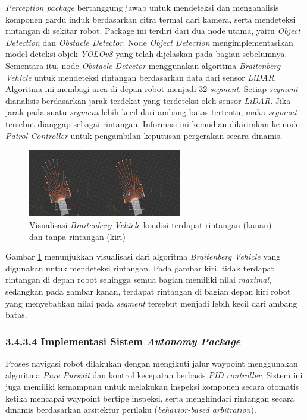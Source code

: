 \emph{Perception package} bertanggung jawab untuk mendeteksi dan menganalisis komponen gardu induk berdasarkan citra termal dari kamera, serta mendeteksi rintangan di sekitar robot. Package ini terdiri dari dua node utama, yaitu \emph{Object Detection} dan \emph{Obstacle Detector}. Node \emph{Object Detection} mengimplementasikan model deteksi objek \emph{YOLOv8} yang telah dijelaskan pada bagian sebelumnya. Sementara itu, node \emph{Obstacle Detector} menggunakan algoritma \emph{Braitenberg Vehicle} untuk mendeteksi rintangan berdasarkan data dari sensor \emph{LiDAR}. Algoritma ini membagi area di depan robot menjadi 32 \emph{segment}. Setiap \emph{segment} dianalisis berdasarkan jarak terdekat yang terdeteksi oleh sensor \emph{LiDAR}. Jika jarak pada suatu \emph{segment} lebih kecil dari ambang batas tertentu, maka \emph{segment} tersebut dianggap sebagai rintangan. Informasi ini kemudian dikirimkan ke node \emph{Patrol Controller} untuk pengambilan keputusan pergerakan secara dinamis.

\begin{figure}[H]
  \centering
  \includegraphics[width=0.6\textwidth]{gambar/bab3/obstacle-bb.png}
  \caption{Visualisasi \emph{Braitenberg Vehicle} kondisi terdapat rintangan (kanan) dan tanpa rintangan (kiri)}
  \label{fig:obstacle-detector}
\end{figure}

Gambar \ref{fig:obstacle-detector} menunjukkan visualisasi dari algoritma \emph{Braitenberg Vehicle} yang digunakan untuk mendeteksi rintangan. Pada gambar kiri, tidak terdapat rintangan di depan robot sehingga semua bagian memiliki nilai \emph{maximal}, sedangkan pada gambar kanan, terdapat rintangan di bagian depan kiri robot yang menyebabkan nilai pada \emph{segment} tersebut menjadi lebih kecil dari ambang batas.


\subsubsection{3.4.3.4 Implementasi Sistem \emph{Autonomy Package}}

Proses navigasi robot dilakukan dengan mengikuti jalur waypoint menggunakan algoritma \emph{Pure Pursuit} dan kontrol kecepatan berbasis \emph{PID controller}. Sistem ini juga memiliki kemampuan untuk melakukan inspeksi komponen secara otomatis ketika mencapai waypoint bertipe inspeksi, serta menghindari rintangan secara dinamis berdasarkan arsitektur perilaku (\emph{behavior-based arbitration}).

